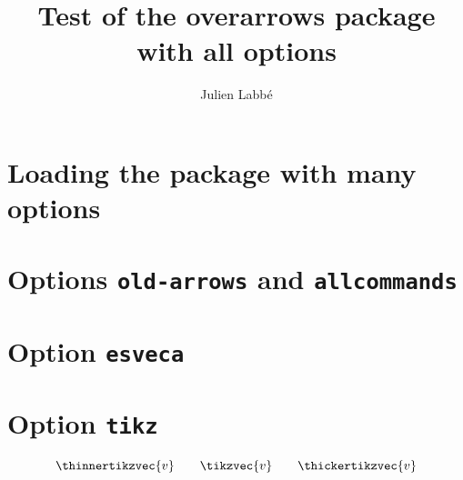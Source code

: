 \documentclass{article}
\title{Test of the \textsf{overarrows} package\\with all options}
\author{Julien Labb\'e}
\begin{document}
\maketitle

\section{Loading the package with many options}

\begin{dispListing}
\usepackage[%
  old-arrows, esvecth, esvecta,
  tikz, pstricks, pstarrows,
  subscripts, allcommands, debug
]{overarrows}
\end{dispListing}

\section{Options \texttt{old-arrows} and \texttt{allcommands}}

\begin{dispExample}
\TestOverArrow*{\overrightarrow}
\end{dispExample}

\begin{dispExample}
\TestOverArrow*{\amsvec}
\end{dispExample}

\section{Option \texttt{esveca}}

\begin{dispExample}
\TestOverArrow*{\esvec}
\end{dispExample}

\section{Option \texttt{tikz}}

\begin{dispExample}
\NewOverArrowCommand[tikz]{\tikzvec}{}
\TestOverArrow*{\tikzvec}
\end{dispExample}

\begin{dispExample}
\NewOverArrowCommand[tikz]{\tikzvec}{}

$$ \thinnertikzvec{v} \qquad \tikzvec{v} \qquad \thickertikzvec{v} $$
\end{dispExample}
\end{document}
